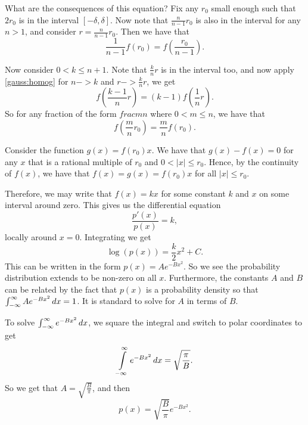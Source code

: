 What are the consequences of this equation? Fix any \(r_0\) small enough such that \(2r_0\) is in the interval \([-\delta, \delta]\). Now note that \(\frac{n}{n-1}r_0\) is also in the interval for
any \(n > 1\), and consider \(r = \frac{n}{n-1} r_0\). Then we have that 
\begin{equation}
\frac{1}{n-1} f(r_0) = f\left(\frac{r_0}{n-1}\right).
\end{equation}

Now consider \(0 < k \leq n + 1\). Note that \(\frac{k}{n}r \) is in the interval too, and now apply \ref{gauss:homog} for \(n -> k\) and \(r -> \frac{k}{n} r\), we get
\begin{equation}
f\left(\frac{k-1}{n}r\right) = (k-1)f\left(\frac{1}{n}r\right).
\end{equation} 
So for any fraction of the form \(frac{m}{n}\) where \(0 < m \leq n\), we have that
\begin{equation}
f\left(\frac{m}{n} r_0\right) = \frac{m}{n} f(r_0). 
\end{equation}

Consider the function \(g(x) = f(r_0) x\). We have that \(g(x) - f(x) = 0\) for any \(x\) that is a rational multiple of \(r_0\) and \(0 < |x| \leq r_0\). Hence, by the continuity of \(f(x)\), 
we have that \(f(x) = g(x) = f(r_0) x\) for all \(|x| \leq r_0\).

Therefore, we may write that \(f(x) = k x\) for some constant \(k\) and \(x\) on some interval around zero. This gives us the differential equation 
\begin{equation}
\frac{p'(x)}{p(x)} = k, 
\end{equation}
locally around \(x = 0\). Integrating we get
\begin{equation}
\log(p(x)) = \frac{k}{2}x^2 + C. 
\end{equation} 
This can be written in the form \(p(x) = Ae^{-Bx^2}\). So we see the probability distribution extends to be non-zero on all \(x\). 
Furthermore, the constants \(A\) and \(B\) can be related 
by the fact that \(p(x)\) is a probability density so that \(\int_{-\infty}^{\infty} Ae^{-Bx^2} \, dx = 1\). It is standard to solve for \(A\) in terms of \(B\).

To solve \(\int_{-\infty}^{\infty} e^{-Bx^2} \, dx\), we square the integral and switch to polar coordinates to get
\begin{equation}
\int\limits_{-\infty}^\infty e^{-Bx^2} \, dx = \sqrt{\frac{\pi}{B}}.
\end{equation}
So we get that \(A = \sqrt{\frac{B}{\pi}}\), and then
\begin{equation}
p(x) = \sqrt{\frac{B}{\pi}} e^{-Bx^2}. 
\end{equation}
